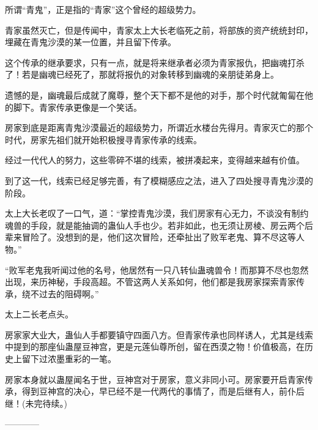 \begin{this_body}
所谓“青鬼”，正是指的“青家”这个曾经的超级势力。

青家虽然灭亡，但是传闻中，青家太上大长老临死之前，将部族的资产统统封印，埋藏在青鬼沙漠的某一位置，并且留下传承。

这个传承的继承要求，只有一点，就是将来继承者必须为青家报仇，把幽魂打杀了！若是幽魂已经死了，那就将报仇的对象转移到幽魂的亲朋徒弟身上。

遗憾的是，幽魂最后成就了魔尊，整个天下都不是他的对手，那个时代就匍匐在他的脚下。青家传承更像是一个笑话。

房家到底是距离青鬼沙漠最近的超级势力，所谓近水楼台先得月。青家灭亡的那个时代，房家先祖们就开始积极搜寻青家传承的线索。

经过一代代人的努力，这些零碎不堪的线索，被拼凑起来，变得越来越有价值。

到了这一代，线索已经足够完善，有了模糊感应之法，进入了四处搜寻青鬼沙漠的阶段。

太上大长老叹了一口气，道：“掌控青鬼沙漠，我们房家有心无力，不谈没有制约魂兽的手段，就是能抽调的蛊仙人手也少。若非如此，也无须让房棱、房云两个后辈来冒险了。没想到的是，他们这次冒险，还牵扯出了败军老鬼、算不尽这等人物。”

“败军老鬼我听闻过他的名号，他居然有一只八转仙蛊魂兽令！而那算不尽也忽然出现，来历神秘，手段高超。不管这两人关系如何，他们都是我房家探索青家传承，绕不过去的阻碍啊。”

太上二长老点头。

房家家大业大，蛊仙人手都要镇守四面八方。但青家传承也同样诱人，尤其是线索中提到的那座仙蛊屋豆神宫，更是元莲仙尊所创，留在西漠之物！价值极高，在历史上留下过浓墨重彩的一笔。

房家本身就以蛊屋闻名于世，豆神宫对于房家，意义非同小可。房家要开启青家传承，得到豆神宫的决心，早已经不是一代两代的事情了，而是后继有人，前仆后继！(未完待续。)

------------

\end{this_body}

